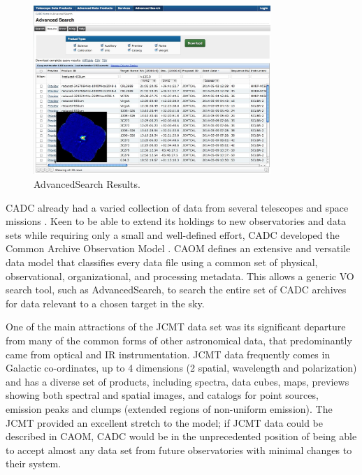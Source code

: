 \documentclass[final,authoryear,5p,times,twocolumn]{elsarticle}
\begin{document}
\begin{figure}[t]
\begin{center}
\includegraphics[width=0.8\textwidth]{acjsa_fig3}
\caption{AdvancedSearch Results.}
\label{fig:asresults}
\end{center}
\end{figure}

CADC already had a varied collection of data from several
telescopes and space missions
\citep{1994ASPC...61..123C,2008SPIE.7016E..16G}. Keen to be able to
extend its holdings to new observatories and data sets while
requiring only a small and well-defined effort, CADC developed
the Common Archive Observation Model
\citep[CAOM:][]{2007ASPC..376..347D,2008ASPC..394..426D}.  CAOM defines an extensive and
versatile data model that classifies every data file using a common set of physical,
observational, organizational, and processing metadata.
This allows a generic VO search tool, such as AdvancedSearch, to search the
entire set of CADC archives for data relevant to a chosen target in the sky.

One of the main attractions of the JCMT data set was its significant
departure from many of the common forms of other astronomical data,
that predominantly came from optical and IR instrumentation. JCMT data
frequently comes in Galactic co-ordinates, up to 4 dimensions (2
spatial, wavelength and polarization) and has a diverse set of
products, including spectra, data cubes, maps, previews showing both spectral
and spatial images,  and catalogs for point sources, emission peaks and
clumps (extended regions of non-uniform emission).  The JCMT
provided an excellent stretch to the model; if JCMT data could be
described in CAOM, CADC would be in the unprecedented position of
being able to accept almost any data set from future observatories
with minimal changes to their system.
\end{document}
